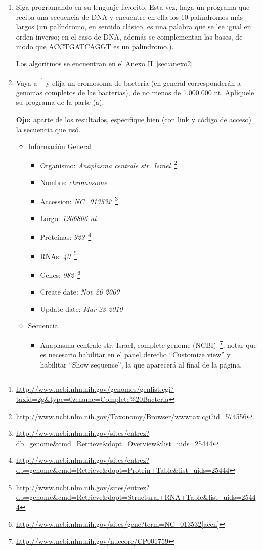 \begin{enumerate}

	\item Siga programando en su lenguaje favorito. Esta vez, haga un programa que reciba una
		secuencia de DNA y encuentre en ella los 10 palíndromos más largos (un palíndromo, en
		sentido clásico, es una palabra que se lee igual en orden inverso; en el caso de DNA, además se
		complementan las bases, de modo que ACCTGATCAGGT es un palíndromo.).

		
		Los algoritmos se encuentran en el Anexo II~\ref{sec:anexo2}

	\item Vaya a~\footnote{\url{http://www.ncbi.nlm.nih.gov/genomes/genlist.cgi?taxid=2g\&type=0\&name=Complete\%20Bacteria}}
		y elija un cromosoma de bacteria (en general corresponderán a genomas completos de las bacterias),
		de no menos de 1.000.000 nt. Aplíquele su programa de la parte (a).

		\textbf{Ojo:} aparte de los resultados, especifique bien (con link y código de acceso) la secuencia que usó.

		\begin{itemize}
			\item Información General
				\begin{itemize}
					\item Organismo: \emph{Anaplasma centrale str. Israel}~\footnote{\url{http://www.ncbi.nlm.nih.gov/Taxonomy/Browser/wwwtax.cgi?id=574556}}
					\item Nombre: \emph{chromosome}
					\item Accession: \emph{NC\_013532}~\footnote{\url{http://www.ncbi.nlm.nih.gov/sites/entrez?db=genome&cmd=Retrieve&dopt=Overview&list_uids=25444}}
					\item Largo: \emph{1206806 nt}
					\item Proteínas:	\emph{923}~\footnote{\url{http://www.ncbi.nlm.nih.gov/sites/entrez?db=genome&cmd=Retrieve&dopt=Protein+Table&list_uids=25444}}
					\item RNAs: \emph{40}~\footnote{\url{http://www.ncbi.nlm.nih.gov/sites/entrez?db=genome&cmd=Retrieve&dopt=Structural+RNA+Table&list_uids=25444}}
					\item Genes: \emph{982}~\footnote{\url{http://www.ncbi.nlm.nih.gov/sites/gene?term=NC_013532[accn]}}
					\item Create date: \emph{Nov 26 2009}
					\item Update date: \emph{Mar 23 2010}
				\end{itemize}
			\item Secuencia
				\begin{itemize}
					\item Anaplasma centrale str. Israel, complete genome (NCBI)~\footnote{\url{http://www.ncbi.nlm.nih.gov/nuccore/CP001759}},
						notar que es necesario habilitar en el panel derecho ``Customize view'' y habilitar ``Show sequence'',
						la que aparecerá al final de la página.\\


\end{itemize}
\end{itemize}
\end{enumerate}
